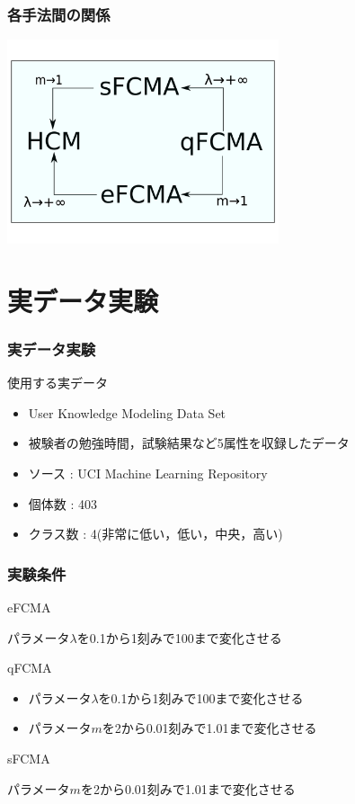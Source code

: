 \documentclass[13pt,dvipdfmx]{beamer}
\begin{document}
\begin{frame}\frametitle{各手法間の関係}
  \begin{center}
    \includegraphics[height=60mm]{method.png}
  \end{center}
\end{frame}

\section{実データ実験}
\begin{frame}\frametitle{実データ実験}
  \begin{block}{使用する実データ}
    \begin{itemize}
     \item User Knowledge Modeling Data Set
     \item 被験者の勉強時間，試験結果など5属性を収録したデータ
     \item ソース : UCI  Machine Learning Repository
     \item 個体数 : 403
     \item クラス数 : 4(非常に低い，低い，中央，高い)
    \end{itemize}
  \end{block}
\end{frame}

\begin{frame}\frametitle{実験条件}
  \begin{block}{eFCMA}
    \begin{center}
      パラメータ$\lambda$を0.1から1刻みで100まで変化させる
    \end{center}
  \end{block}
  \begin{block}{qFCMA}
    \begin{itemize}
      \item パラメータ$\lambda$を0.1から1刻みで100まで変化させる
      \item パラメータ$m$を2から0.01刻みで1.01まで変化させる
    \end{itemize}
  \end{block}
  \begin{block}{sFCMA}
    \begin{center}
      パラメータ$m$を2から0.01刻みで1.01まで変化させる
    \end{center}
  \end{block}
\end{frame}
\end{document}
